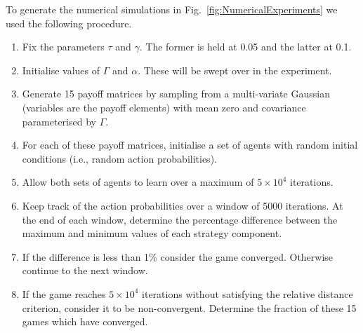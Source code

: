 \documentclass{article}
\begin{document}
To generate the numerical simulations in Fig.~\ref{fig:NumericalExperiments} we used the
following procedure.

\begin{enumerate}
   \item Fix the parameters $\tau$ and $\gamma$. The former is held at 0.05 and the latter at 0.1.
   \item Initialise values of $\Gamma$ and $\alpha$. These will be swept over in the experiment.
\item Generate 15 payoff matrices by sampling from a multi-variate Gaussian 
(variables are the payoff elements) with mean zero and covariance parameterised by $\Gamma$.
\item For each of these payoff matrices, initialise a set of agents with random initial conditions (i.e., random action probabilities).
\item Allow both sets of agents to learn over a maximum of $5 \times 10^4$ iterations.
\item Keep track of the action probabilities over a window of 5000 iterations. At the end of each window, determine the percentage difference between the maximum and minimum values of each strategy component.
\item If the difference is less than 1\% consider the game converged. Otherwise continue to the next window.
\item If the game reaches $5 \times 10^4$ iterations without satisfying the relative distance criterion, consider it to be non-convergent. Determine the fraction of these 15 games which have converged.

\end{enumerate}
  
\end{document}
